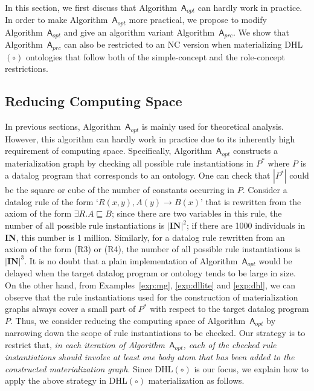 \documentclass[final,1p,times]{elsarticle}
\begin{document}
In this section, we first discuss that Algorithm~$\mathsf{A}_{opt}$ can hardly work in practice.
In order to make Algorithm~$\mathsf{A}_{opt}$ more practical,
we propose to modify Algorithm~$\mathsf{A}_{opt}$ and give an algorithm variant Algorithm~$\mathsf{A}_{prc}$.
We show that Algorithm~$\mathsf{A}_{prc}$ can also be restricted to an NC version
when materializing DHL$(\circ)$ ontologies that follow both of the simple-concept
and the role-concept restrictions.

\subsection{Reducing Computing Space}

In previous sections, Algorithm~$\mathsf{A}_{opt}$ is mainly used for theoretical analysis.
However, this algorithm can hardly work in practice due to its inherently
high requirement of computing space. Specifically,
Algorithm~$\mathsf{A}_{opt}$ constructs a materialization graph by checking all possible rule
instantiations in $P^*$ where $P$ is a datalog program that corresponds to an ontology.
One can check that $|P^*|$ could be the square or cube of the number of constants occurring in $P$.
Consider a datalog rule of the form `$R(x,y),A(y)\rightarrow B(x)$'
that is rewritten from the axiom of the form $\exists R.A\sqsubseteq B$;
since there are two variables in this rule, the number of all possible rule instantiations
is $|\textbf{IN}|^2$; if there are
1000 individuals in \textbf{IN}, this number is 1 million.
Similarly, for a datalog rule rewritten from an axiom of the form (R3) or (R4),
the number of all possible rule instantiations is $|\textbf{IN}|^3$.
It is no doubt that a plain implementation of Algorithm~$\mathsf{A}_{opt}$ would be delayed
when the target datalog program or ontology
tends to be large in size.
On the other hand, from Examples~\ref{exp:mg}, \ref{exp:dllite} and \ref{exp:dhl},
we can observe that the rule instantiations used for the construction
of materialization graphs always cover a small part of $P^*$ with respect to the target datalog program $P$.
Thus, we consider reducing the computing space of Algorithm~$\mathsf{A}_{opt}$
by narrowing down the scope of rule instantiations to be checked.
Our strategy is to restrict that, \emph{in each iteration of Algorithm~$\mathsf{A}_{opt}$,
each of the checked rule instantiations should involve at least one body atom that has been
added to the constructed materialization graph}.
Since DHL$(\circ)$
is our focus, we explain how to apply the above strategy in DHL$(\circ)$ materialization
as follows.
\end{document}
